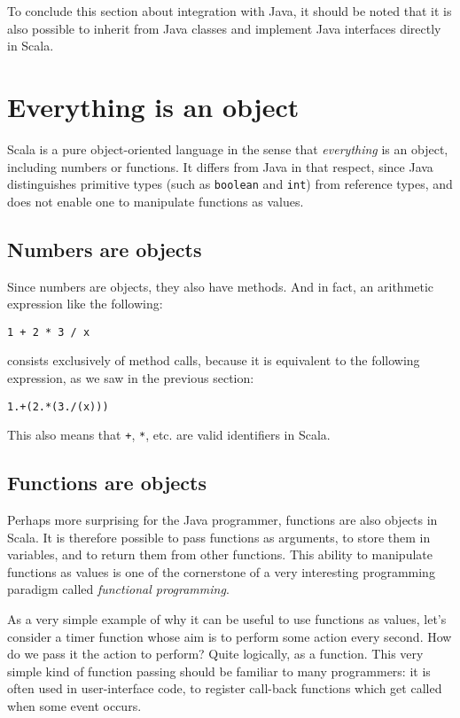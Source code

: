 \documentclass[a4paper,12pt,twoside,titlepage]{article}
\begin{document}
To conclude this section about integration with Java, it should be
noted that it is also possible to inherit from Java classes and
implement Java interfaces directly in Scala.

\section{Everything is an object}
\label{sec:everything-an-object}

Scala is a pure object-oriented language in the sense that
\emph{everything} is an object, including numbers or functions. It
differs from Java in that respect, since Java distinguishes
primitive types (such as \lstinline?boolean? and \lstinline?int?) from reference
types, and does not enable one to manipulate functions as values.

\subsection{Numbers are objects}
\label{sec:numbers-are-objects}

Since numbers are objects, they also have methods. And in fact, an
arithmetic expression like the following:
\begin{lstlisting}
1 + 2 * 3 / x
\end{lstlisting}
consists exclusively of method calls, because it is equivalent to the
following expression, as we saw in the previous section:
\begin{lstlisting}
1.+(2.*(3./(x)))
\end{lstlisting}
This also means that \lstinline?+?, \lstinline?*?, etc. are valid identifiers
in Scala.

\subsection{Functions are objects}
\label{sec:funct-are-objects}

Perhaps more surprising for the Java programmer, functions are also
objects in Scala. It is therefore possible to pass functions as
arguments, to store them in variables, and to return them from other
functions. This ability to manipulate functions as values is one of
the cornerstone of a very interesting programming paradigm called
\emph{functional programming}.

As a very simple example of why it can be useful to use functions as
values, let's consider a timer function whose aim is to perform some
action every second. How do we pass it the action to perform? Quite
logically, as a function. This very simple kind of function passing
should be familiar to many programmers: it is often used in
user-interface code, to register call-back functions which get called
when some event occurs.
\end{document}
